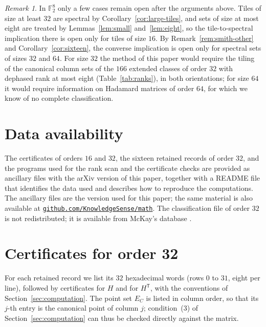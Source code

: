 \documentclass[11pt]{amsart}
\theoremstyle{definition}
\theoremstyle{remark}
\newtheorem{remark}[theorem]{Remark}
\numberwithin{equation}{section}
\numberwithin{table}{section}
\newcommand{\F}{\mathbb{F}}
\newcommand{\T}{\mathsf{T}}
\begin{document}
\begin{remark}\label{rem:dim8}
In $\F_2^8$ only a few cases remain open after the arguments above. Tiles of size at least $32$ are spectral by Corollary~\ref{cor:large-tiles}, and sets of size at most eight are treated by Lemmas~\ref{lem:small} and~\ref{lem:eight}, so the tile-to-spectral implication there is open only for tiles of size $16$. By Remark~\ref{rem:smith-other} and Corollary~\ref{cor:sixteen}, the converse implication is open only for spectral sets of sizes $32$ and $64$. For size $32$ the method of this paper would require the tiling of the canonical column sets of the $166$ extended classes of order $32$ with dephased rank at most eight (Table~\ref{tab:ranks}), in both orientations; for size $64$ it would require information on Hadamard matrices of order $64$, for which we know of no complete classification.
\end{remark}

\appendix

\section{Data availability}\label{app:data}

The certificates of orders $16$ and $32$, the sixteen retained records of order $32$, and the programs used for the rank scan and the certificate checks are provided as ancillary files with the arXiv version of this paper, together with a README file that identifies the data used and describes how to reproduce the computations. The ancillary files are the version used for this paper; the same material is also available at \href{https://github.com/KnowledgeSense/math/tree/main/preprints/Fugledes-Conjecture-Holds-in-F2-7-October-6-2026}{\texttt{github.com/KnowledgeSense/math}}. The classification file of order $32$ is not redistributed; it is available from McKay's database \cite{McK}.

\section{Certificates for order 32}\label{app:certificates}

For each retained record we list its $32$ hexadecimal words (rows $0$ to $31$, eight per line), followed by certificates for $H$ and for $H^{\T}$, with the conventions of Section~\ref{sec:computation}. The point set $E_C$ is listed in column order, so that its $j$-th entry is the canonical point of column $j$; condition~(3) of Section~\ref{sec:computation} can thus be checked directly against the matrix.
\end{document}
